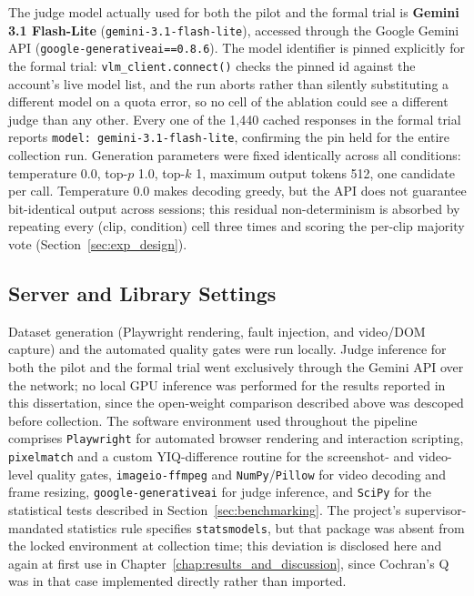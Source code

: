 The judge model actually used for both the pilot and the formal trial is \textbf{Gemini 3.1 Flash-Lite} (\texttt{gemini-3.1-flash-lite}), accessed through the Google Gemini API (\texttt{google-generativeai==0.8.6}). The model identifier is pinned explicitly for the formal trial: \texttt{vlm\_client.connect()} checks the pinned id against the account's live model list, and the run aborts rather than silently substituting a different model on a quota error, so no cell of the ablation could see a different judge than any other. Every one of the 1{,}440 cached responses in the formal trial reports \texttt{model: gemini-3.1-flash-lite}, confirming the pin held for the entire collection run. Generation parameters were fixed identically across all conditions: temperature \num{0.0}, top-$p$ \num{1.0}, top-$k$ \num{1}, maximum output tokens \num{512}, one candidate per call. Temperature \num{0.0} makes decoding greedy, but the API does not guarantee bit-identical output across sessions; this residual non-determinism is absorbed by repeating every (clip, condition) cell three times and scoring the per-clip majority vote (Section~\ref{sec:exp_design}).

\subsection{Server and Library Settings}
Dataset generation (Playwright rendering, fault injection, and video/DOM capture) and the automated quality gates were run locally. Judge inference for both the pilot and the formal trial went exclusively through the Gemini API over the network; no local GPU inference was performed for the results reported in this dissertation, since the open-weight comparison described above was descoped before collection. The software environment used throughout the pipeline comprises \texttt{Playwright} for automated browser rendering and interaction scripting, \texttt{pixelmatch} and a custom YIQ-difference routine for the screenshot- and video-level quality gates, \texttt{imageio-ffmpeg} and \texttt{NumPy}/\texttt{Pillow} for video decoding and frame resizing, \texttt{google-generativeai} for judge inference, and \texttt{SciPy} for the statistical tests described in Section~\ref{sec:benchmarking}. The project's supervisor-mandated statistics rule specifies \texttt{statsmodels}, but that package was absent from the locked environment at collection time; this deviation is disclosed here and again at first use in Chapter~\ref{chap:results_and_discussion}, since Cochran's Q was in that case implemented directly rather than imported.

